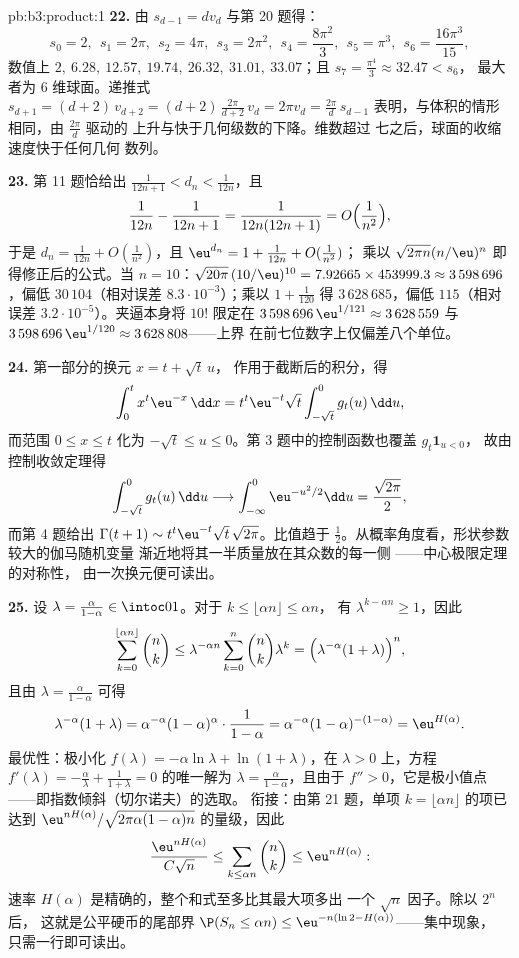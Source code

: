 \begin{solution}{pb:b3:product:1}
\textbf{22.} 由 $s_{d-1} = dv_d$ 与第 20 题得：
\[
s_0 = 2,\ \ s_1 = 2\pi,\ \ s_2 = 4\pi,\ \ s_3 = 2\pi^2,\ \
s_4 = \frac{8\pi^2}3,\ \ s_5 = \pi^3,\ \ s_6 =
\frac{16\pi^3}{15},
\]
数值上 $2,\ 6.28,\ 12.57,\ 19.74,\ 26.32,\ 31.01,\
33.07$；且 $s_7 = \frac{\pi^4}3 \approx 32.47 < s_6$，
最大者为 $6$ 维球面。递推式 $s_{d+1} =
(d+2)\,v_{d+2} = (d+2)\,\frac{2\pi}{d+2}\,v_d = 2\pi v_d =
\frac{2\pi}d\,s_{d-1}$ 表明，与体积的情形相同，由 $\frac{2\pi}d$ 驱动的
上升与快于几何级数的下降。维数超过
七之后，球面的收缩速度快于任何几何
数列。

\textbf{23.} 第 11 题恰给出 $\frac1{12n+1} < d_n <
\frac1{12n}$，且
\[
\frac1{12n} - \frac1{12n+1} = \frac1{12n(12n+1)} =
O\Bigl(\frac1{n^2}\Bigr),
\]
于是 $d_n = \frac1{12n} + O(\frac1{n^2})$，且 $\eu^{d_n} = 1 +
\frac1{12n} + O(\frac1{n^2})$；
乘以 $\sqrt{2\pi n}(n/\eu)^n$ 即得修正后的公式。当 $n =
10$：$\sqrt{20\pi}\,(10/\eu)^{10} = 7.92665 \times 453999.3
\approx 3\,598\,696$，偏低 $30\,104$（相对误差
$8.3\cdot10^{-3}$）；乘以 $1 + \frac1{120}$ 得
$3\,628\,685$，偏低 $115$（相对误差
$3.2\cdot10^{-5}$）。夹逼本身将 $10!$ 限定在
$3\,598\,696\,\eu^{1/121} \approx 3\,628\,559$ 与
$3\,598\,696\,\eu^{1/120} \approx 3\,628\,808$——上界
在前七位数字上仅偏差八个单位。

\textbf{24.} 第一部分的换元 $x = t + \sqrt t\,u$，
作用于截断后的积分，得
\[
\int_0^{t} x^{t}\eu^{-x}\,\dd x
= t^{t}\eu^{-t}\sqrt t\int_{-\sqrt t}^{0} g_t(u)\,\dd u ,
\]
而范围 $0 \leq x \leq t$ 化为 $-\sqrt t \leq u \leq
0$。第 3 题中的控制函数也覆盖 $g_t\mathbf 1_{u < 0}$，
故由控制收敛定理得
\[
\int_{-\sqrt t}^{0}g_t(u)\,\dd u \longrightarrow
\int_{-\infty}^{0}\eu^{-u^2/2}\dd u = \frac{\sqrt{2\pi}}2 ,
\]
而第 4 题给出 $\Gamma(t+1) \sim
t^t\eu^{-t}\sqrt t\,\sqrt{2\pi}$。比值趋于
$\frac12$。从概率角度看，形状参数较大的伽马随机变量
渐近地将其一半质量放在其众数的每一侧
——中心极限定理的对称性，
由一次换元便可读出。

\textbf{25.} 设 $\lambda = \frac{\alpha}{1-\alpha} \in
\intoc01$。对于 $k \leq \lfloor\alpha n\rfloor \leq \alpha n$，
有 $\lambda^{k - \alpha n} \geq 1$，因此
\[
\sum_{k=0}^{\lfloor\alpha n\rfloor}\binom nk
\leq \lambda^{-\alpha n}\sum_{k=0}^{n}\binom nk\lambda^{k}
= \Bigl(\lambda^{-\alpha}(1 + \lambda)\Bigr)^{n},
\]
且由 $\lambda = \frac\alpha{1-\alpha}$ 可得
\[
\lambda^{-\alpha}(1+\lambda)
= \alpha^{-\alpha}(1-\alpha)^{\alpha}\cdot\frac1{1-\alpha}
= \alpha^{-\alpha}(1-\alpha)^{-(1-\alpha)}
= \eu^{H(\alpha)} .
\]
最优性：极小化 $f(\lambda) = -\alpha\ln\lambda +
\ln(1+\lambda)$，在 $\lambda > 0$ 上，方程 $f'(\lambda)
= -\frac\alpha\lambda + \frac1{1+\lambda} = 0$ 的唯一解为
$\lambda = \frac\alpha{1-\alpha}$，且由于
$f'' > 0$，它是极小值点——即指数倾斜（切尔诺夫）的选取。
衔接：由第 21 题，单项 $k =
\lfloor\alpha n\rfloor$ 的项已达到
$\eu^{nH(\alpha)}/\sqrt{2\pi\alpha(1-\alpha)n}$ 的量级，因此
\[
\frac{\eu^{nH(\alpha)}}{C\sqrt n} \leq
\sum_{k\leq\alpha n}\binom nk \leq \eu^{nH(\alpha)} :
\]
速率 $H(\alpha)$ 是精确的，整个和式至多比其最大项多出
一个 $\sqrt n$ 因子。除以 $2^n$ 后，
这就是公平硬币的尾部界 $\P(S_n \leq \alpha n) \leq
\eu^{-n(\ln2 - H(\alpha))}$——集中现象，
只需一行即可读出。
\end{solution}
